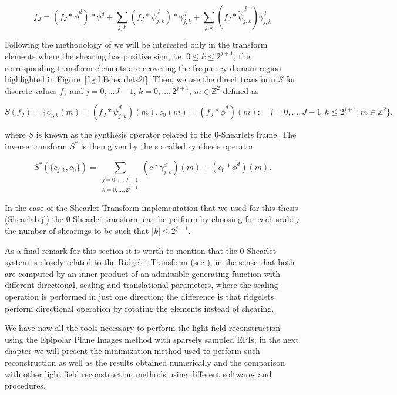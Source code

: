 $$
f_J=(f_J\ast \overline{\phi}^d)\ast \phi^d+\sum_{j,k}(f_J\ast\overline{\psi}^d_{j,k})\ast \gamma^d_{j,k}+\sum_{j,k}(f_J\ast \overline{\tilde{\psi}}^d_{j,k})\tilde{\gamma}^d_{j,k}
$$

Following the methodology of \cite{LF-Shearlets} we will be interested only in the transform elements where the shearing has positive sign, i.e. $0\leq k\leq 2^{j+1}$, the corresponding transform elements are ccovering the frequency domain region highlighted in Figure~\ref{fig:LFshearlets2f}. Then, we use the direct transform $S$ for discrete values $f_J$ and $j=0,\ldots J-1$, $k=0,\ldots, 2^{j+1}$, $m\in\mathbb{Z}^2$ defined as 

\begin{equation}
\label{eq:0analysis}
S(f_J)=\{ c_{j,k}(m)=(f_J\ast \overline{\psi}_{j,k}^d)(m),c_0(m)=(f_J\ast \overline{\phi}^d)(m):\quad j=0,\ldots,J-1,k\leq 2^{j+1},m\in\mathbb{Z}^2\}.
\end{equation}

where $S$ is known as the synthesis operator related to the $0$-Shearlets frame. The inverse transform $S^*$ is then given by the so called synthesis operator 

\begin{equation}
\label{eq:0synthesis}
S^*(\{c_{j,k},c_0\})=\sum_{\begin{matrix}j=0,\ldots,J-1\\k=0,\ldots,2^{j+1}\end{matrix}}(c\ast \gamma_{j,k}^d)(m)+(c_0\ast\phi^d)(m).
\end{equation}

In the case of the Shearlet Transform implementation that we used for this thesis (Shearlab.jl) the $0$-Shearlet transform can be perform by choosing for each scale $j$ the number of shearings to be such that $|k|\leq 2^{j+1}$.

\bigskip

As a final remark for this section it is worth to mention that the $0$-Shearlet system is closely related to the Ridgelet Transform (see \cite{ridglet}), in the sense that both are computed by an inner product of an admissible generating function with different directional, scaling and translational parameters, where the scaling operation is performed in just one direction; the difference is that ridgelets perform directional operation by rotating the elements instead of shearing.

\bigskip

We have now all the tools necessary to perform the light field reconstruction using the Epipolar Plane Images method with sparsely sampled EPIs; in the next chapter we will present the minimization method used to perform such reconstruction as well as the results obtained numerically and the comparison with other light field reconstruction methods using different softwares and procedures. 
